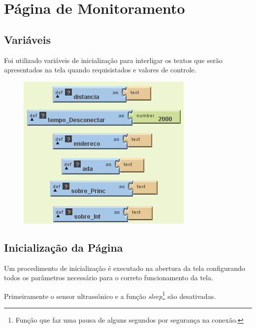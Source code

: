 \documentclass[portugues, brazil, a4paper,12pt]{article}
\begin{document}

\newpage
\section{Página de Monitoramento}
\subsection{Variáveis}
Foi utilizado variáveis de inicialização para interligar os textos que serão apresentados na tela quando requisistados e valores de controle.


\begin{figure}[H]
	\centering
	\includegraphics[scale=.8]{img/monitoramento/variaveis.png}
	
\end{figure}

\subsection{Inicialização da Página}
Um procedimento de inicialização é executado na abertura da tela configurando todos os parâmetros necessário para o correto funcionamento da tela.

Primeiramente o sensor ultrassônico e a função \textit{sleep}\footnote{Função que faz uma pausa de alguns segundos por segurança na conexão.} são desativadas.
\end{document}
